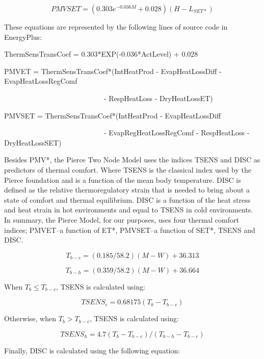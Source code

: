 \begin{equation}
PMVSET = (0.303{e^{ - 0.036M}} + 0.028)(H - {L_{SET*}})
\end{equation}

These equations are represented by the following lines of source code in EnergyPlus:

ThermSensTransCoef = 0.303*EXP(-0.036*ActLevel) + 0.028

PMVET = ThermSensTransCoef*(IntHeatProd - EvapHeatLossDiff - EvapHeatLossRegComf

~~~~~~~~~~~~~~~~~~~~~~~~~~~~- RespHeatLoss - DryHeatLossET)

PMVSET = ThermSensTransCoef*(IntHeatProd - EvapHeatLossDiff

~~~~~~~~~~~~~~~~~~~~~~~~~~~~- EvapRegHeatLossRegComf - RespHeatLoss - DryHeatLossSET)

Besides PMV*, the Pierce Two Node Model uses the indices TSENS and DISC as predictors of thermal comfort. Where TSENS is the classical index used by the Pierce foundation and is a function of the mean body temperature. DISC is defined as the relative thermoregulatory strain that is needed to bring about a state of comfort and thermal equilibrium. DISC is a function of the heat stress and heat strain in hot environments and equal to TSENS in cold environments. In summary, the Pierce Model, for our purposes, uses four thermal comfort indices; PMVET--a function of ET*, PMVSET--a function of SET*, TSENS and DISC.

\begin{equation}
{T_{b - c}} = (0.185/58.2)(M - W) + 36.313
\end{equation}

\begin{equation}
{T_{b - h}} = (0.359/58.2)(M - W) + 36.664
\end{equation}

When \({T_b} \le {T_{b - c}}\), TSENS is calculated using:

\begin{equation}
TSEN{S_c} = 0.68175({T_b} - {T_{b - c}}) 
\end{equation}

Otherwise, when \({T_b} > {T_{b - c}}\), TSENS is calculated using:

\begin{equation}
TSEN{S_h} = 4.7({T_b} - {T_{b - c}})/({T_{b - h}} - {T_{b - c}})
\end{equation}

Finally, DISC is calculated using the following equation:

